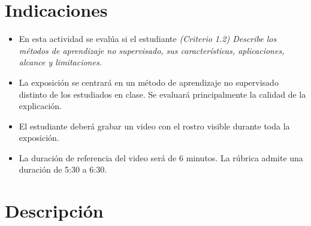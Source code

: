 \documentclass[a4,11pt]{aleph-notas}
\begin{document}
\encabezado

\section{Indicaciones}

\begin{itemize}[leftmargin=*]
\item En esta actividad se evalúa si el estudiante \textit{(Criterio 1.2) Describe los métodos de aprendizaje no supervisado, sus características, aplicaciones, alcance y limitaciones.}
\item La exposición se centrará en un método de aprendizaje no supervisado distinto de los estudiados en clase. Se evaluará principalmente la calidad de la explicación.
\item El estudiante deberá grabar un video con el rostro visible durante toda la exposición.
\item La duración de referencia del video será de 6 minutos. La rúbrica admite una duración de 5:30 a 6:30.
\end{itemize}

\section{Descripción}
\end{document}
